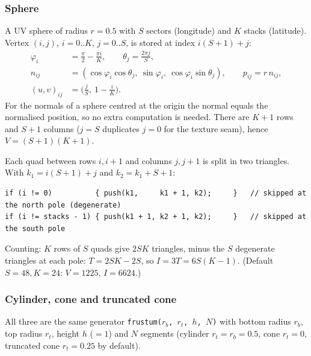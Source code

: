\documentclass[a4paper, 11pt]{article}
\newcommand{\code}[1]{\texttt{#1}}
\begin{document}
\subsubsection{Sphere}

A UV sphere of radius $r=0.5$ with $S$ sectors (longitude) and $K$ stacks (latitude). Vertex $(i,j)$,
$i=0..K$, $j=0..S$, is stored at index $i(S+1)+j$:
\begin{align*}
  \varphi_i &= \tfrac{\pi}{2}-\tfrac{\pi i}{K}, \qquad \theta_j=\tfrac{2\pi j}{S},\\
  n_{ij} &= (\cos\varphi_i\cos\theta_j,\ \sin\varphi_i,\ \cos\varphi_i\sin\theta_j), \qquad p_{ij}=r\,n_{ij},\\
  (u,v)_{ij} &= \bigl(\tfrac{j}{S},\ 1-\tfrac{i}{K}\bigr).
\end{align*}
For the normals of a sphere centred at the origin the normal equals the normalised position, so no extra computation is needed.
There are $K+1$ rows and $S+1$ columns ($j=S$ duplicates $j=0$ for the texture seam), hence
$V=(S+1)(K+1)$.

Each quad between rows $i,i{+}1$ and columns $j,j{+}1$ is split in two triangles. With $k_1=i(S+1)+j$ and $k_2=k_1+S+1$:
\begin{lstlisting}
if (i != 0)          { push(k1,     k1 + 1, k2);     }   // skipped at the north pole (degenerate)
if (i != stacks - 1) { push(k1 + 1, k2 + 1, k2);     }   // skipped at the south pole
\end{lstlisting}
Counting: $K$ rows of $S$ quads give $2SK$ triangles, minus the $S$ degenerate triangles at each pole:
$T=2SK-2S$, so $I=3T=6S(K-1)$. (Default $S=48,K=24$: $V=1225$, $I=6624$.)

\subsubsection{Cylinder, cone and truncated cone}

All three are the same generator \code{frustum($r_b$, $r_t$, $h$, $N$)} with bottom radius $r_b$, top radius $r_t$,
height $h$ ($=1$) and $N$ segments (cylinder $r_t=r_b=0.5$, cone $r_t=0$, truncated cone $r_t=0.25$ by default).
\end{document}
